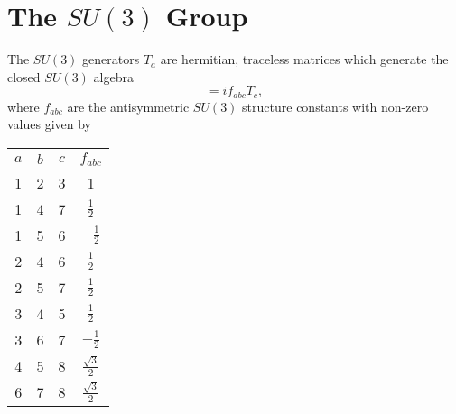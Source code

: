 \chapter{The $SU(3)$ Group }
The $SU(3)$ generators $T_a$ are hermitian, traceless matrices which generate the closed $SU(3)$ algebra
\begin{equation}
[T_a,T_b]=if_{abc}T_c,
\end{equation}
where $f_{abc}$ are the antisymmetric $SU(3)$ structure constants with non-zero values given by
\begin{table}[h!]
	\centering
	\begin{tabular}{|c c c c|} 
		\hline
		$a$ &$b$ &$c$ &$f_{abc}$ \\ [0.5ex] 
		\hline
		1 & 2 & 3 &1  \\ 
		1 & 4 &7 &$\frac{1}{2}$ \\
		1 & 5 &6 &$-\frac{1}{2}$ \\
		2 & 4 &6 &$\frac{1}{2}$ \\
		2 & 5 &7 &$\frac{1}{2}$\\ 
		3 & 4 &5 &$\frac{1}{2}$\\
		3 & 6 &7 &$-\frac{1}{2}$\\
		4 & 5 &8 &$\frac{\sqrt{3}}{2}$\\
		6 & 7 &8 &$\frac{\sqrt{3}}{2}$\\[1ex] 
		\hline
	\end{tabular}
	\label{table:1}
\end{table}

